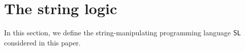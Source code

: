 
\section{The string logic}\label{sec:logic}

In this section, we define the string-manipulating programming language $\mathsf{SL}$ considered in this paper.



%
%
%
